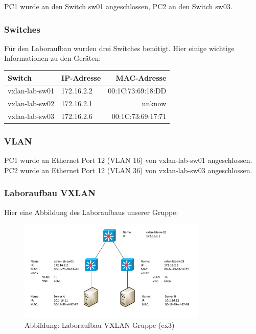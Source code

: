 \documentclass[a4,12pt]{scrartcl}
\begin{document}
\noindent PC1 wurde an den Switch sw01 angeschlossen, PC2 an den Switch sw03. 

\subsubsection{Switches}
Für den Laboraufbau wurden drei Switches benötigt. Hier einige wichtige Informationen zu den Geräten: 
\begin{center}
    \begin{tabular}{@{} l l r@{}}\toprule    
    {Switch} & {IP-Adresse} & {MAC-Adresse}\\ \midrule
    vxlan-lab-sw01 & 172.16.2.2 & 00:1C:73:69:18:DD\\ \addlinespace
    vxlan-lab-sw02 & 172.16.2.1 & unknow\\ \addlinespace
    vxlan-lab-sw03 & 172.16.2.6 & 00:1C:73:69:17:71\\
    \bottomrule
    \end{tabular}
\end{center}

\subsubsection{VLAN}
PC1 wurde an Ethernet Port 12 (VLAN 16) von vxlan-lab-sw01 angeschlossen. PC2 wurde an Ethernet Port 12 (VLAN 36) von vxlan-lab-sw03 angeschlossen. 

\subsubsection{Laboraufbau VXLAN}
Hier eine Abbildung des Laboraufbaus unserer Gruppe: 
\begin{figure} [H]
	\begin{center}
	\includegraphics[width=0.80\textwidth]{./draws/vxlan_ex3_laboraufbau.pdf}
	\caption{Abbildung: Laboraufbau VXLAN Gruppe (ex3)}
	\label{x}
	\end{center}
\end{figure}
\end{document}
